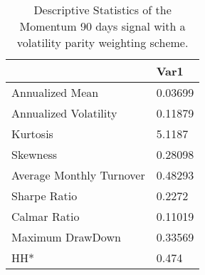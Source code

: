 \begin{table}[H]
\centering
\begin{tabular}{ll}
& Var1 \\ 
\hline 
Annualized Mean & 0.03699 \\ 
Annualized Volatility & 0.11879 \\ 
Kurtosis & 5.1187 \\ 
Skewness & 0.28098 \\ 
Average Monthly Turnover & 0.48293 \\ 
Sharpe Ratio & 0.2272 \\ 
Calmar Ratio & 0.11019 \\ 
Maximum DrawDown & 0.33569 \\ 
HH* & 0.474 \\ 
\hline
\end{tabular}
\caption{Descriptive Statistics of the Momentum 90 days signal with a volatility parity weighting scheme.}
\label{MOM90VP}
\end{table}